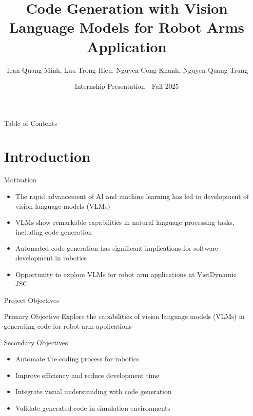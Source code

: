 \documentclass{beamer}
\title{Code Generation with Vision Language Models for Robot Arms Application}
\author{Tran Quang Minh, Luu Trong Hieu, Nguyen Cong Khanh, Nguyen Quang Trung}
\institute[FPT University - VietDynamic JSC]{
 \textit{Department of Artificial Intelligence} \\
 FPT University - VietDynamic JSC}
\date{Internship Presentation - Fall 2025}
\begin{document}
\begin{frame}
    \titlepage
\end{frame}

\begin{frame}{Table of Contents}
    \tableofcontents
\end{frame}

\section{Introduction} 

\begin{frame}{Motivation}
    \begin{itemize} 	
        \item The rapid advancement of \alert{AI and machine learning} has led to development of vision language models (VLMs)
        \item VLMs show remarkable capabilities in \alert{natural language processing tasks}, including code generation
        \item \alert{Automated code generation} has significant implications for software development in robotics
        \item Opportunity to explore VLMs for \alert{robot arm applications} at VietDynamic JSC
    \end{itemize}
\end{frame}

\begin{frame}[label=objectives]{Project Objectives}
    \begin{block}{Primary Objective}
        Explore the capabilities of \alert{vision language models (VLMs)} in generating code for robot arm applications
    \end{block}
    \begin{block}{Secondary Objectives}
        \begin{itemize}
            \item Automate the coding process for robotics
            \item Improve efficiency and reduce development time
            \item Integrate visual understanding with code generation
            \item Validate generated code in simulation environments
        \end{itemize}
    \end{block}
\end{frame}
\end{document}
